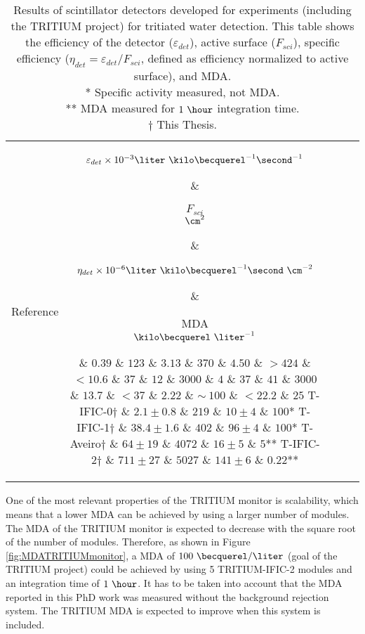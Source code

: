 \begin{enumerate}
\begin{table}[htbp]
\centering{}%
\begin{tabular}{lcrcc}
\toprule 
Reference & \parbox{5.5em}{$\varepsilon_{det}\times10^{-3}\\\liter~\kilo\becquerel^{-1}\second^{-1}$}  & \parbox{4.5em}{\raggedleft $F_{sci}$\\ $\cm^2$}  & \parbox{6.5em}{$\eta_{det}\times 10^{-6}\\\liter~\kilo\becquerel^{-1}\second~\cm^{-2}$} &  \parbox{5.5em}{MDA\\$\kilo\becquerel~\liter^{-1}$} \tabularnewline
\midrule
\midrule 
\cite{Muramatsu} & $0.39$ & $123$ & $3.13$ & $370$ \tabularnewline
\cite{Moghissi} & $4.50$ & $>424$ & $<10.6$ & $37$ \tabularnewline
\cite{Osborne} & $12$ & $3000$ & $4$ & $37$ \tabularnewline
\cite{Ratnakaran} & $41$ & $3000$ & $13.7$ & $<37$ \tabularnewline
\cite{Hofstetter1} & $2.22$ & $\sim~100$ & $<22.2$ & $25$ \tabularnewline
T-IFIC-0$\dagger$ & $2.1 \pm 0.8$ & $219$ & $10 \pm 4$ & $100$* \tabularnewline
T-IFIC-1$\dagger$ & $38.4 \pm 1.6$ & $402$ & $96 \pm 4$ & $100$* \tabularnewline
T-Aveiro$\dagger$ & $64 \pm 19$ & $4072$ & $16 \pm 5$ & $5$** \tabularnewline
T-IFIC-2$\dagger$ & $711 \pm 27$ & $5027$ & $141 \pm 6$ & $0.22$** \tabularnewline
\bottomrule
\end{tabular}
\caption{Results of scintillator detectors developed for experiments (including the TRITIUM project) for tritiated water detection. This table shows the efficiency of the detector ($\varepsilon_{det}$), active surface ($F_{sci}$), specific efficiency ($\eta_{det}=\varepsilon_{det}/F_{sci}$, defined as efficiency normalized to active surface), and MDA.\\
* Specific activity measured, not MDA.\\ 
** MDA measured for $1~\hour$ integration time.\\
$\dagger$ This Thesis.}
\label{tab:ComparisonResultsTritium}
\end{table}

One of the most relevant properties of the TRITIUM monitor is scalability, which means that a lower MDA can be achieved by using a larger number of modules. The MDA of the TRITIUM monitor is expected to decrease with the square root of the number of modules. Therefore, as shown in Figure \ref{fig:MDATRITIUMmonitor}, a MDA of  $100~\becquerel/\liter$ (goal of the TRITIUM project) could be achieved by using 5 TRITIUM-IFIC-2 modules and an integration time of $1~\hour$. It has to be taken into account that the MDA reported in this PhD work was measured without the background rejection system. The TRITIUM MDA is expected to improve when this system is included.


\end{enumerate}
